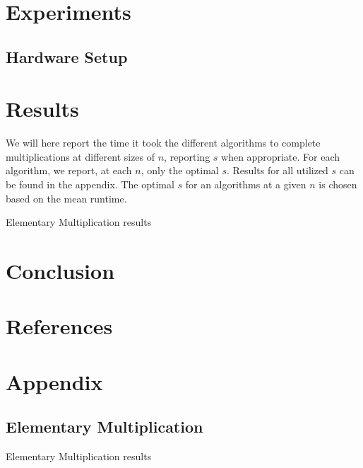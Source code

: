 \documentclass[12pt, a4paper]{article}
\begin{document}
\section{Experiments}

\subsection{Hardware Setup}


\section{Results}
We will here report the time it took the different algorithms to complete multiplications at different sizes of $n$, reporting $s$ when appropriate. For each algorithm, we report, at each $n$, only the optimal $s$. Results for all utilized $s$ can be found in the appendix. The optimal $s$ for an algorithms at a given $n$ is chosen based on the mean runtime.

\begin{table}[p]
\begin{center}
\label{tbl:horse_ele}

\caption{Elementary Multiplication results}
\end{center}
\end{table}


\section{Conclusion}

\section{References}

\section{Appendix}

\subsection{Elementary Multiplication}
\begin{table}[p]
\begin{center}
\label{tbl:horse_ele}

\caption{Elementary Multiplication results}
\end{center}
\end{table}
\end{document}
